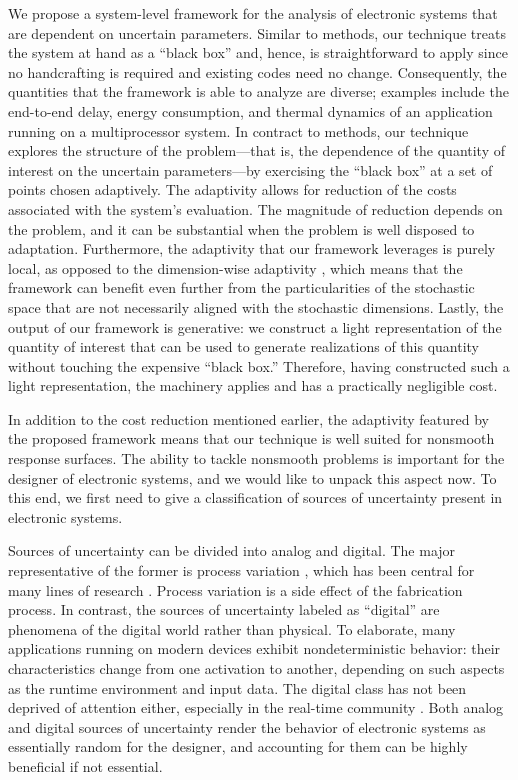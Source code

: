 We propose a system-level framework for the analysis of electronic systems that
are dependent on uncertain parameters. Similar to  methods, our
technique treats the system at hand as a ``black box'' and, hence, is
straightforward to apply since no handcrafting is required and existing codes
need no change. Consequently, the quantities that the framework is able to
analyze are diverse; examples include the end-to-end delay, energy consumption,
and thermal dynamics of an application running on a multiprocessor system. In
contract to  methods, our technique explores the structure of the
problem---that is, the dependence of the quantity of interest on the uncertain
parameters---by exercising the ``black box'' at a set of points chosen
adaptively. The adaptivity allows for reduction of the costs associated with the
system's evaluation. The magnitude of reduction depends on the problem, and it
can be substantial when the problem is well disposed to adaptation. Furthermore,
the adaptivity that our framework leverages is purely local, as opposed to the
dimension-wise adaptivity \cite{klimke2006}, which means that the framework can
benefit even further from the particularities of the stochastic space that are
not necessarily aligned with the stochastic dimensions. Lastly, the output of
our framework is generative: we construct a light representation of the quantity
of interest that can be used to generate realizations of this quantity without
touching the expensive ``black box.'' Therefore, having constructed such a light
representation, the  machinery applies and has a practically negligible
cost.

In addition to the cost reduction mentioned earlier, the adaptivity featured by
the proposed framework means that our technique is well suited for nonsmooth
response surfaces. The ability to tackle nonsmooth problems is important for the
designer of electronic systems, and we would like to unpack this aspect now. To
this end, we first need to give a classification of sources of uncertainty
present in electronic systems.

Sources of uncertainty can be divided into analog and digital. The major
representative of the former is process variation \cite{srivastava2005}, which
has been central for many lines of research \cite{bhardwaj2008, juan2012,
lee2013, ukhov2014, ukhov2015}. Process variation is a side effect of the
fabrication process. In contrast, the sources of uncertainty labeled as
``digital'' are phenomena of the digital world rather than physical. To
elaborate, many applications running on modern devices exhibit nondeterministic
behavior: their characteristics change from one activation to another, depending
on such aspects as the runtime environment and input data. The digital class has
not been deprived of attention either, especially in the real-time community
\cite{quinton2012, diaz2002, santinelli2011, yang2013, tanasa2015}. Both analog
and digital sources of uncertainty render the behavior of electronic systems as
essentially random for the designer, and accounting for them can be highly
beneficial if not essential.

